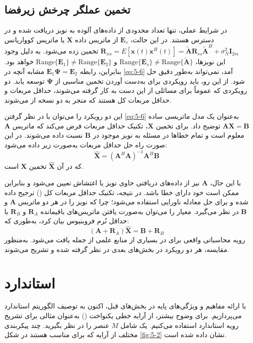 \subsection{تخمین عملگر چرخش زیرفضا}
\label{subsec:5-2-3}
در شرایط عملی، تنها تعداد محدودی از داده‌های آلوده به نویز دریافت شده و در دسترس هستند. در این حالت، $\bm{E}_s$ از ماتریس داده $\bm{X}$ یا ماتریس کوواریانس $\bm{R}_{xx} = E[\bm{x}(t)\bm{x}^H(t)] = \tilde{\bm{A}}\bm{R}_{ss}\tilde{\bm{A}}^H + \sigma_N^2 \bm{I}_{2m}$ تخمین زده می‌شود. به دلیل وجود این نویزها، $\text{Range}\{\bm{E}_s\} \neq \text{Range}\{\tilde{\bm{A}}\}$ و $\text{Range}\{\bm{E}_1\} \neq \text{Range}\{\bm{E}_2\}$ خواهد بود. بنابراین، رابطه $\bm{E}_1 \bm{\Psi} = \bm{E}_2$ مشابه آنچه در \eqref{eq:5-6} آمد، نمی‌تواند به‌طور دقیق حل شود. از این رو، باید رویکردی برای به‌دست آوردن تخمین مناسبی از $\bm{\Psi}$ توسعه یابد. دو رویکردی که عموماً برای مسائلی از این دست به کار گرفته می‌شوند، حداقل مربعات \cite{5-4} و حداقل مربعات کل \cite{5-5} هستند که منجر به دو نسخه از  می‌شوند.

این دو رویکرد را می‌توان با در نظر گرفتن \eqref{eq:5-6} به‌عنوان یک مدل ماتریسی ساده $\bm{AX} = \bm{B}$ توضیح داد. برای تخمین $\bm{X}$، تکنیک حداقل مربعات فرض می‌کند که ماتریس $\bm{A}$ معلوم است و تمام خطاها در مسئله به نویز موجود در $\bm{B}$ نسبت داده می‌شوند. در این صورت راه حل حداقل مربعات به‌صورت زیر داده می‌شود:
\begin{equation}
	\hat{\bm{X}} = (\bm{A}^H \bm{A})^{-1} \bm{A}^H \bm{B}
	\nonumber
\end{equation}
که در آن $\hat{\bm{X}}$ تخمین $\bm{X}$ است.

با این حال، $\bm{A}$ نیز از داده‌های دریافتی حاوی نویز یا اغتشاش تعیین می‌شود و بنابراین ممکن است خود دارای خطا باشد. در نتیجه، تکنیک حداقل مربعات کل () ترجیح داده شده و برای حل معادله ناورایی استفاده می‌شود؛ چرا که نویز را در هر دو ماتریس $\bm{A}$ و $\bm{B}$ در نظر می‌گیرد. معیار  را می‌توان به‌صورت یافتن ماتریس‌های باقیمانده $\bm{R}_A$ و $\bm{R}_B$ با حداقل نُرم فروبنیوس بیان کرد، به‌طوری که:
\begin{equation}
	(\bm{A} + \bm{R}_A)\hat{\bm{X}} = \bm{B} + \bm{R}_B
	\nonumber
\end{equation}
رویه محاسباتی واقعی برای  در بسیاری از منابع علمی از جمله \cite{5-5} یافت می‌شود. به‌منظور مقایسه، هر دو رویکرد  در بخش‌های بعدی در نظر گرفته شده و تشریح می‌شوند.

\section{ استاندارد}
\label{sec:5-3}
با ارائه مفاهیم و ویژگی‌های پایه  در بخش‌های قبل، اکنون به توصیف الگوریتم  استاندارد می‌پردازیم. برای وضوح بیشتر، از آرایه خطی یکنواخت () به‌عنوان مثالی برای تشریح رویه  استاندارد استفاده می‌کنیم. یک  شامل $M$ عنصر را در نظر بگیرید. چند پیکربندی مختلف از آرایه که برای  مناسب هستند در شکل \ref{fig:5-2} نشان داده شده است.

